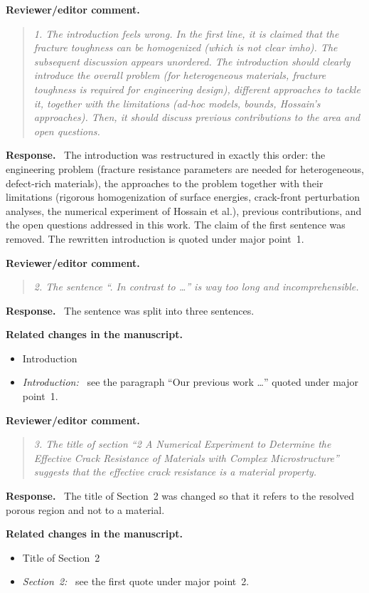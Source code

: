 \documentclass[pdflatex,sn-mathphys-num]{sn-jnl}
\newenvironment{reviewercomment}
  {\par\noindent\textbf{Reviewer/editor comment.}\begin{quote}\itshape}
  {\end{quote}}
\newenvironment{response}
  {\par\noindent\textbf{Response.}\ }
  {\par}
\newenvironment{relatedchanges}
  {\par\noindent\textbf{Related changes in the manuscript.}\begin{itemize}\small}
  {\end{itemize}}
\newcommand{\msloc}[1]{\textit{#1:}\ }
\newcommand{\relhead}[1]{\item[]\vspace*{0.2\baselineskip}#1}
\begin{document}
\begin{reviewercomment}
1. The introduction feels wrong. In the first line, it is claimed that the fracture toughness can be homogenized (which
is not clear imho). The subsequent discussion appears unordered. The introduction should clearly introduce the overall
problem (for heterogeneous materials, fracture toughness is required for engineering design), different approaches to
tackle it, together with the limitations (ad-hoc models, bounds, Hossain's approaches). Then, it should discuss previous
contributions to the area and open questions.
\end{reviewercomment}
\begin{response}
The introduction was restructured in exactly this order: the engineering problem (fracture resistance parameters are needed for heterogeneous, defect-rich materials), the approaches to the problem together with their limitations (rigorous homogenization of surface energies, crack-front perturbation analyses, the numerical experiment of Hossain et al.), previous contributions, and the open questions addressed in this work. The claim of the first sentence was removed. The rewritten introduction is quoted under major point~1.
\end{response}

\begin{reviewercomment}
2. The sentence ``. In contrast to \dots'' is way too long and incomprehensible.
\end{reviewercomment}
\begin{response}
The sentence was split into three sentences.
\end{response}
\begin{relatedchanges}
\relhead{Introduction}
\item \msloc{Introduction} see the paragraph ``Our previous work \dots'' quoted under major point~1.
\end{relatedchanges}

\begin{reviewercomment}
3. The title of section ``2 A Numerical Experiment to Determine the Effective Crack Resistance of Materials with Complex
Microstructure'' suggests that the effective crack resistance is a material property.
\end{reviewercomment}
\begin{response}
The title of Section~2 was changed so that it refers to the resolved porous region and not to a material.
\end{response}
\begin{relatedchanges}
\relhead{Title of Section~2}
\item \msloc{Section~2} see the first quote under major point~2.
\end{relatedchanges}
\end{document}
